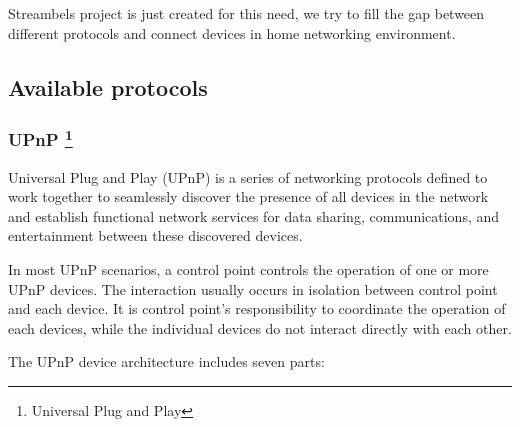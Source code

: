 Streambels project is just created for this need, we try to fill the gap between
different protocols and connect devices in home networking environment.

\subsection{Available protocols}
\subsubsection[UPnP]{UPnP \footnote{Universal Plug and Play}}
Universal Plug and Play (UPnP) is a series of networking protocols defined to
work together to seamlessly discover the presence of all devices in the network
and establish functional network services for data sharing, communications, and
entertainment between these discovered devices. 

In most UPnP scenarios, a control point controls the operation of one or more
UPnP devices. The interaction usually occurs in isolation between control point
and each device. It is control point's responsibility to coordinate the operation of
each devices, while the individual devices do not interact directly with each other.

The UPnP device architecture \cite{upnp} \label{upnp} \label{upnpdevice}
includes seven parts:

